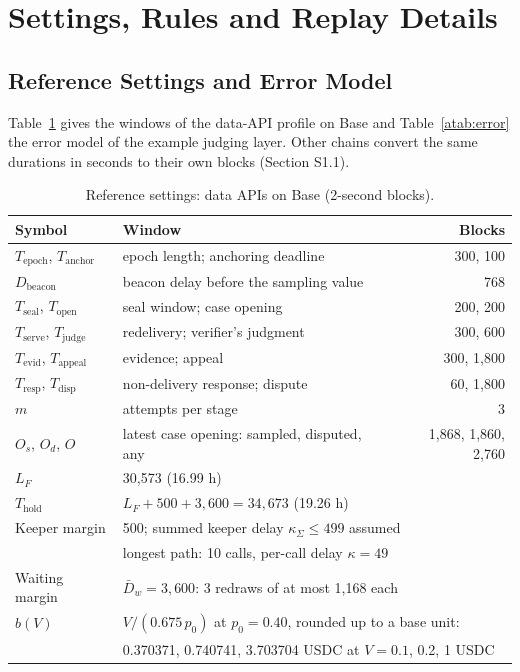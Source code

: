 \documentclass[10pt,a4paper]{article}
\newcommand{\Thold}{T_{\mathrm{hold}}}
\newcommand{\kS}{\kappa_{\Sigma}}
\newcommand{\Dw}{\bar D_w}
\theoremstyle{plain}
\theoremstyle{remark}
\begin{document}
\setcounter{section}{9}
\section{Settings, Rules and Replay Details}
\label{app:moved}

\subsection{Reference Settings and Error Model}
\label{app:settings}
Table~\ref{atab:profile} gives the windows of the data-API profile on Base and Table~\ref{atab:error} the error model of the example judging layer. Other chains convert the same durations in seconds to their own blocks (Section S1.1).
\begin{table}[t]
\centering
\caption{Reference settings: data APIs on Base (2-second blocks).}
\label{atab:profile}
\scriptsize
\setlength{\tabcolsep}{3pt}\renewcommand{\arraystretch}{0.9}
\begin{tabular}{@{}llr@{}}
\toprule
Symbol & Window & Blocks \\
\midrule
$T_{\mathrm{epoch}}$, $T_{\mathrm{anchor}}$ & epoch length; anchoring deadline & 300, 100 \\
$D_{\mathrm{beacon}}$ & beacon delay before the sampling value & 768 \\
$T_{\mathrm{seal}}$, $T_{\mathrm{open}}$ & seal window; case opening & 200, 200 \\
$T_{\mathrm{serve}}$, $T_{\mathrm{judge}}$ & redelivery; verifier's judgment & 300, 600 \\
$T_{\mathrm{evid}}$, $T_{\mathrm{appeal}}$ & evidence; appeal & 300, 1,800 \\
$T_{\mathrm{resp}}$, $T_{\mathrm{disp}}$ & non-delivery response; dispute & 60, 1,800 \\
$m$ & attempts per stage & 3 \\
$O_s$, $O_d$, $O$ & latest case opening: sampled, disputed, any & 1,868, 1,860, 2,760 \\
\midrule
$L_F$ & \multicolumn{2}{l}{30,573 (16.99 h)} \\
$\Thold$ & \multicolumn{2}{l}{$L_F+500+3{,}600=34{,}673$ (19.26 h)} \\
Keeper margin & \multicolumn{2}{l}{500; summed keeper delay $\kS \le 499$ assumed} \\
 & \multicolumn{2}{l}{longest path: 10 calls, per-call delay $\kappa=49$} \\
Waiting margin & \multicolumn{2}{l}{$\Dw=3{,}600$: 3 redraws of at most 1,168 each} \\
\midrule
$b(V)$ & \multicolumn{2}{l}{$V/(0.675\,p_0)$ at $p_0=0.40$, rounded up to a base unit:} \\
 & \multicolumn{2}{l}{0.370371, 0.740741, 3.703704 USDC at $V=0.1$, 0.2, 1 USDC} \\
\bottomrule
\end{tabular}
\end{table}
\end{document}
